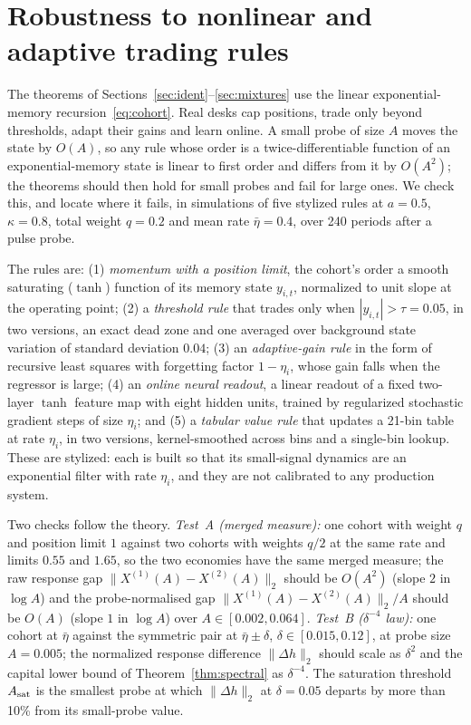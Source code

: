 \documentclass[12pt]{article}
\theoremstyle{definition}
\theoremstyle{remark}
\begin{document}
\section{Robustness to nonlinear and adaptive trading rules}\label{sec:learners}

The theorems of Sections~\ref{sec:ident}--\ref{sec:mixtures} use the linear exponential-memory recursion~\eqref{eq:cohort}. Real desks cap positions, trade only beyond thresholds, adapt their gains and learn online. A small probe of size $A$ moves the state by $O(A)$, so any rule whose order is a twice-differentiable function of an exponential-memory state is linear to first order and differs from it by $O(A^2)$; the theorems should then hold for small probes and fail for large ones. We check this, and locate where it fails, in simulations of five stylized rules at $a=0.5$, $\kappa=0.8$, total weight $q=0.2$ and mean rate $\bar\eta=0.4$, over 240 periods after a pulse probe.

The rules are: (1) \emph{momentum with a position limit}, the cohort's order a smooth saturating ($\tanh$) function of its memory state $y_{i,t}$, normalized to unit slope at the operating point; (2) a \emph{threshold rule} that trades only when $|y_{i,t}|>\tau=0.05$, in two versions, an exact dead zone and one averaged over background state variation of standard deviation $0.04$; (3) an \emph{adaptive-gain rule} in the form of recursive least squares with forgetting factor $1-\eta_i$, whose gain falls when the regressor is large; (4) an \emph{online neural readout}, a linear readout of a fixed two-layer $\tanh$ feature map with eight hidden units, trained by regularized stochastic gradient steps of size $\eta_i$; and (5) a \emph{tabular value rule} that updates a 21-bin table at rate $\eta_i$, in two versions, kernel-smoothed across bins and a single-bin lookup. These are stylized: each is built so that its small-signal dynamics are an exponential filter with rate $\eta_i$, and they are not calibrated to any production system.

Two checks follow the theory. \emph{Test~A (merged measure):} one cohort with weight $q$ and position limit $1$ against two cohorts with weights $q/2$ at the same rate and limits $0.55$ and $1.65$, so the two economies have the same merged measure; the raw response gap $\|X^{(1)}(A)-X^{(2)}(A)\|_2$ should be $O(A^2)$ (slope $2$ in $\log A$) and the probe-normalised gap $\|X^{(1)}(A)-X^{(2)}(A)\|_2/A$ should be $O(A)$ (slope $1$ in $\log A$) over $A\in[0.002,0.064]$. \emph{Test~B ($\delta^{-4}$ law):} one cohort at $\bar\eta$ against the symmetric pair at $\bar\eta\pm\delta$, $\delta\in[0.015,0.12]$, at probe size $A=0.005$; the normalized response difference $\|\Delta h\|_2$ should scale as $\delta^2$ and the capital lower bound of Theorem~\ref{thm:spectral} as $\delta^{-4}$. The saturation threshold $A_{\rm sat}$ is the smallest probe at which $\|\Delta h\|_2$ at $\delta=0.05$ departs by more than 10\% from its small-probe value.
\end{document}
